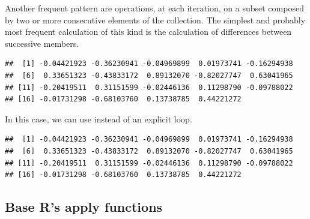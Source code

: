 \documentclass[krantz2,ChapterTOCs]{krantz}\usepackage{knitr}
\begin{document}
\begin{explainbox}
Another frequent pattern are operations, at each iteration, on a subset composed by two or more consecutive elements of the collection. The simplest and probably most frequent calculation of this kind is the calculation of differences between successive members.
\begin{knitrout}\footnotesize
{}\color{fgcolor}\begin{kframe}
\begin{alltt}
\hlstd{(}\hlstd{)}
 \hlkwb{<-} \hlstd{(}\hlstd{)}
 \hlkwb{<-} \hlstd{(} \hlopt{-} \hlstd{)}
   \hlstd{(} 
   \hlkwb{<-} \hlstd{a.vector[i} \hlopt{+} \hlstd{]} \hlopt{-} 
  \hlstd{\}}
\end{alltt}
\begin{verbatim}
##  [1] -0.04421923 -0.36230941 -0.04969899  0.01973741 -0.16294938
##  [6]  0.33651323 -0.43833172  0.89132070 -0.82027747  0.63041965
## [11] -0.20419511  0.31151599 -0.02446136  0.11298790 -0.09788022
## [16] -0.01731298 -0.68103760  0.13738785  0.44221272
\end{verbatim}
\end{kframe}
\end{knitrout}

In this case, we can use  instead of an explicit loop.
\begin{knitrout}\footnotesize
{}\color{fgcolor}\begin{kframe}
\begin{alltt}
 \hlkwb{<-} 
\end{alltt}
\begin{verbatim}
##  [1] -0.04421923 -0.36230941 -0.04969899  0.01973741 -0.16294938
##  [6]  0.33651323 -0.43833172  0.89132070 -0.82027747  0.63041965
## [11] -0.20419511  0.31151599 -0.02446136  0.11298790 -0.09788022
## [16] -0.01731298 -0.68103760  0.13738785  0.44221272
\end{verbatim}
\end{kframe}
\end{knitrout}
\end{explainbox}

\subsection{Base R's apply functions}
\end{document}

